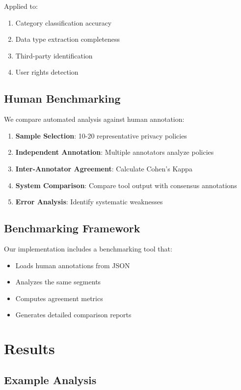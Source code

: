 \documentclass[conference]{IEEEtran}
\begin{document}
Applied to:
\begin{enumerate}
    \item Category classification accuracy
    \item Data type extraction completeness
    \item Third-party identification
    \item User rights detection
\end{enumerate}

\subsection{Human Benchmarking}

We compare automated analysis against human annotation:

\begin{enumerate}
    \item \textbf{Sample Selection}: 10-20 representative privacy policies
    \item \textbf{Independent Annotation}: Multiple annotators analyze policies
    \item \textbf{Inter-Annotator Agreement}: Calculate Cohen's Kappa
    \item \textbf{System Comparison}: Compare tool output with consensus annotations
    \item \textbf{Error Analysis}: Identify systematic weaknesses
\end{enumerate}

\subsection{Benchmarking Framework}

Our implementation includes a benchmarking tool that:

\begin{itemize}
    \item Loads human annotations from JSON
    \item Analyzes the same segments
    \item Computes agreement metrics
    \item Generates detailed comparison reports
\end{itemize}

\section{Results}

\subsection{Example Analysis}
\end{document}
